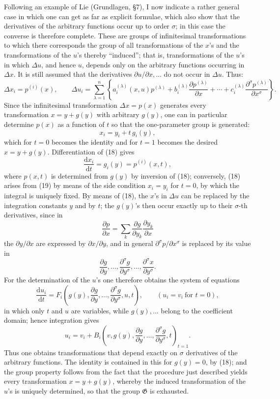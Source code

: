 \documentclass[11pt]{article}
\newcommand{\D}{\Delta}
\providecommand{\dd}{\mathrm d}
\providecommand{\G}{\mathfrak G}
\providecommand{\p}{\partial}
\begin{document}
Following an example of Lie (Grundlagen, \S{}7), I now indicate a rather general case in which one can get as far as explicit formulae, which also show that the derivatives of the arbitrary functions occur up to order \(\sigma\); in this case the converse is therefore complete. These are groups of infinitesimal transformations to which there corresponds the group of all transformations of the \(x\)'s and the transformations of the \(u\)'s thereby ``induced''; that is, transformations of the \(u\)'s in which \(\D u\), and hence \(u\), depends only on the arbitrary functions occurring in \(\D x\). It is still assumed that the derivatives \(\p u/\p x,\ldots\) do not occur in \(\D u\). Thus:
\[
\D x_i=p^{(i)}(x),\qquad
\D u_i=
\sum_{\lambda=1}^{n}\left\{
a_i^{(\lambda)}(x,u)p^{(\lambda)}
+b_i^{(\lambda)}\frac{\p p^{(\lambda)}}{\p x}
+\cdots+
c_i^{(\lambda)}\frac{\p^\sigma p^{(\lambda)}}{\p x^\sigma}
\right\}.
\]
Since the infinitesimal transformation \(\D x=p(x)\) generates every transformation \(x=y+g(y)\) with arbitrary \(g(y)\), one can in particular determine \(p(x)\) as a function of \(t\) so that the one-parameter group is generated:
\begin{equation}
x_i=y_i+t\,g_i(y),
\tag{18}
\end{equation}
which for \(t=0\) becomes the identity and for \(t=1\) becomes the desired \(x=y+g(y)\). Differentiation of (18) gives
\begin{equation}
\frac{\dd x_i}{\dd t}=g_i(y)=p^{(i)}(x,t),
\tag{19}
\end{equation}
where \(p(x,t)\) is determined from \(g(y)\) by inversion of (18); conversely, (18) arises from (19) by means of the side condition \(x_i=y_i\) for \(t=0\), by which the integral is uniquely fixed. By means of (18), the \(x\)'s in \(\D u\) can be replaced by the integration constants \(y\) and by \(t\); the \(g(y)\)'s then occur exactly up to their \(\sigma\)-th derivatives, since in
\[
\frac{\p p}{\p x}=\sum_k\frac{\p g}{\p y_k}\frac{\p y_k}{\p x}
\]
the \(\p y/\p x\) are expressed by \(\p x/\p y\), and in general \(\p^\sigma p/\p x^\sigma\) is replaced by its value in
\[
\frac{\p g}{\p y},\ldots,\frac{\p^\sigma g}{\p y^\sigma},\ldots,\frac{\p^\sigma x}{\p y^\sigma}.
\]
For the determination of the \(u\)'s one therefore obtains the system of equations
\[
\frac{\dd u_i}{\dd t}
=
F_i\!\left(g(y),\frac{\p g}{\p y},\ldots,\frac{\p^\sigma g}{\p y^\sigma},u,t\right),
\qquad (u_i=v_i\ \text{for }t=0),
\]
in which only \(t\) and \(u\) are variables, while \(g(y),\ldots\) belong to the coefficient domain; hence integration gives
\[
u_i=v_i+
B_i\!\left(v,g(y),\frac{\p g}{\p y},\ldots,\frac{\p^\sigma g}{\p y^\sigma},t\right)_{t=1}.
\]
Thus one obtains transformations that depend exactly on \(\sigma\) derivatives of the arbitrary functions. The identity is contained in this for \(g(y)=0\), by (18); and the group property follows from the fact that the procedure just described yields every transformation \(x=y+g(y)\), whereby the induced transformation of the \(u\)'s is uniquely determined, so that the group \(\G\) is exhausted.
\end{document}
